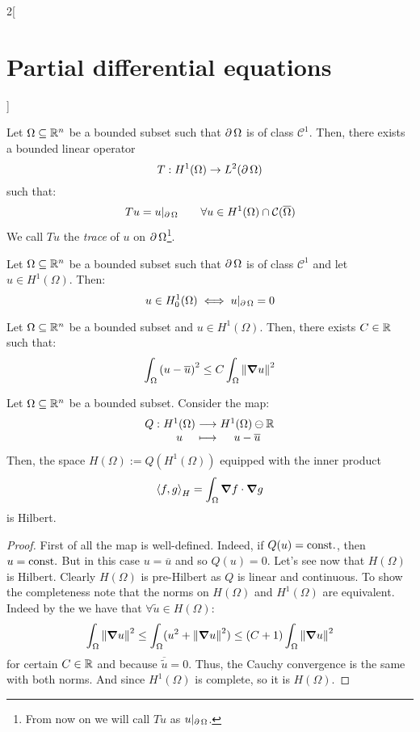 \documentclass[../../../main_math.tex]{subfiles}
\begin{document}
\begin{multicols}{2}[\section{Partial differential equations}]
\begin{definition}
  \end{definition}
  \begin{theorem}
    Let $\Omega\subseteq \mathbb{R}^n$ be a bounded subset such that $\operatorname{\partial}{\Omega}$ is of class $\mathcal{C}^1$. Then, there exists a bounded linear operator
    $$T:H^1(\Omega)\rightarrow L^2(\operatorname{\partial}{\Omega})$$
    such that:
    $$Tu=u|_{\operatorname{\partial}{\Omega}}\qquad\forall u\in H^1(\Omega)\cap \mathcal{C}(\overline{\Omega})$$
    We call $Tu$ the \emph{trace} of $u$ on $\operatorname{\partial}{\Omega}$\footnote{From now on we will call $Tu$ as $u|_{\operatorname{\partial}{\Omega}}$.}.
  \end{theorem}
  \begin{theorem}\label{PDE:traceequivalence}
    Let $\Omega\subseteq \mathbb{R}^n$ be a bounded subset such that $\operatorname{\partial}{\Omega}$ is of class $\mathcal{C}^1$ and let $u\in H^1(\Omega)$. Then:
    $$u\in H_0^1(\Omega)\iff u|_{\operatorname{\partial}{\Omega}}=0$$
  \end{theorem}
  \begin{proposition}\label{PDE:poincareinequality}
    Let $\Omega\subseteq \mathbb{R}^n$ be a bounded subset and $u\in H^1(\Omega)$. Then, there exists $C\in\mathbb{R}$ such that:
    $$\int_\Omega{(u-\overline{u})}^2\leq C\int_\Omega\left\|\grad u\right\|^2$$
  \end{proposition}
  \begin{proposition}
    Let $\Omega\subseteq \mathbb{R}^n$ be a bounded subset. Consider the map:
    $$\function{Q}{H^1(\Omega)}{H^1(\Omega)\ominus\RR}{u}{u-\overline{u}}$$
    Then, the space $H(\Omega):=Q(H^1(\Omega))$ equipped with the inner product $${\left\langle f,g\right\rangle}_{H}=\int_\Omega \grad{f}\cdot \grad{g}$$
    is Hilbert.
  \end{proposition}
  \begin{proof}
    First of all the map is well-defined. Indeed, if $Q(u)=\text{const.}$, then $u=\text{const.}$ But in this case $u=\overline{u}$ and so $Q(u)=0$. Let's see now that $H(\Omega)$ is Hilbert.
    Clearly $H(\Omega)$ is pre-Hilbert as $Q$ is linear and continuous. To show the completeness note that the norms on $H(\Omega)$ and $H^1(\Omega)$ are equivalent. Indeed by the  we have that $\forall \tilde{u}\in H(\Omega)$:
    $$\int_\Omega \left\|\grad{u}\right\|^2\leq\int_\Omega (u^2+\left\|\grad{u}\right\|^2)\leq(C+1)\int_\Omega \left\|\grad{u}\right\|^2$$
    for certain $C\in\mathbb{R}$ and because $\overline{\tilde{u}}=0$. Thus, the Cauchy convergence is the same with both norms. And since $H^1(\Omega)$ is complete, so it is $H(\Omega)$.

\end{proof}
\end{multicols}
\end{document}
